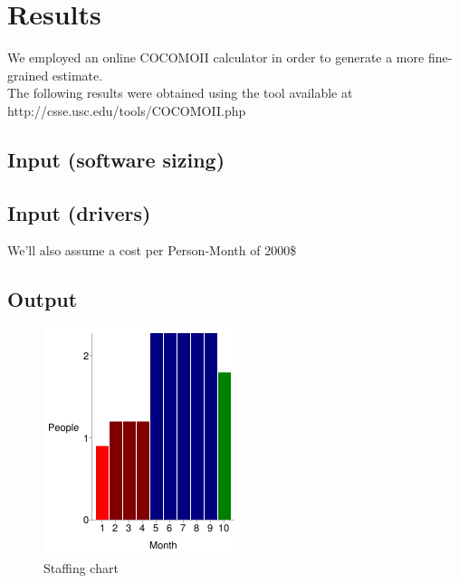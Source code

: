 \section{Results}
We employed an online COCOMOII calculator in order to generate a more fine-grained estimate. \\
The following results were obtained using the tool available at \\
http://csse.usc.edu/tools/COCOMOII.php \\

\subsection{Input (software sizing)}


\subsection{Input (drivers)}


We'll also assume a cost per Person-Month of 2000\$

\subsection{Output}





\begin{figure} [h]
\centering
\includegraphics[scale=1.0]{chapters/cocomo_data/chart.png}
\caption{Staffing chart}
\end{figure}

